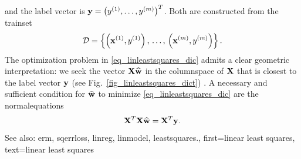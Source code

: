 {{  and the \gls{label} \gls{vector} is 
  ${\bf y}= \big(y^{(1)},\ldots,y^{(m)}\big)^{T}$. 
  Both are constructed from the \gls{trainset}
  $$\mathcal{D} = \left\{ \left( {\bf x}^{(1)},y^{(1)} \right), \,\ldots, \,
 			   \left( {\bf x}^{(m)},y^{(m)} \right) \right\}.$$ 
  The optimization problem in \eqref{eq_linleastsquares_dic} admits a clear 
  geometric interpretation: we seek the vector ${\bf X} \widehat{{\bf w}}$ in the 
  \gls{columnspace} of ${\bf X}$ that is closest to the label vector ${\bf y}$ 
  (see Fig.~\ref{fig_linleastsquares_dict}) \cite[Ch. 8]{BoydConvexBook}. 
  A necessary and sufficient condition for $\widehat{{\bf w}}$ to minimize 
  \eqref{eq_linleastsquares_dic} are the \gls{normalequations} 
  $$ {\bf X}^{T} {\bf X} \widehat{{\bf w}} = {\bf X}^{T} {\bf y}. $$
		See also: \gls{erm}, \gls{sqerrloss}, \gls{linreg}, \gls{linmodel}, \gls{leastsquares}.},
	first={linear least squares},
	text={linear least squares}
}

